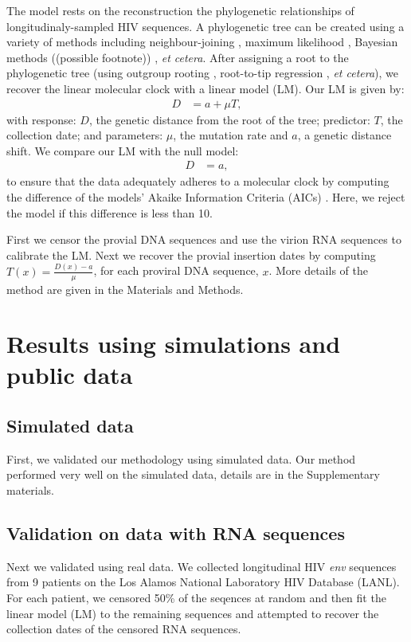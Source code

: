 \documentclass[12pt,onecolumn,twoside]{pnas-new}
\begin{document}
The model rests on the reconstruction the phylogenetic relationships of longitudinaly-sampled HIV sequences.
A phylogenetic tree can be created using a variety of methods including neighbour-joining \cite{Saitou87}, maximum likelihood \cite{fasttree,raxml}, Bayesian methods ((possible footnote)) \cite{beast,MRBAYES}, \emph{et cetera}.
After assigning a root to the phylogenetic tree (using outgroup rooting  \cite{Huelsenbeck02}, root-to-tip regression  \cite{Korber00}, \emph{et cetera}), we recover the linear molecular clock with a linear model (LM).
Our LM is given by:
\begin{align}
	D &= a + \mu T,\label{eq:glm}
\end{align}
with response: $D$, the genetic distance from the root of the tree; predictor: $T$, the collection date; and parameters: $\mu$, the mutation rate and $a$, a genetic distance shift.
We compare our LM with the null model:
\begin{align}
	D &= a,\label{eq:null}
\end{align}
to ensure that the data adequately adheres to a molecular clock by computing the difference of the models' Akaike Information Criteria (AICs) \cite{Akaike74}.
Here, we reject the model if this difference is less than 10.

First we censor the provial DNA sequences and use the virion RNA sequences to calibrate the LM.
Next we recover the provial insertion dates by computing $T(x) = \frac{D(x) - a}{\mu}$, for each proviral DNA sequence, $x$.
More details of the method are given in the Materials and Methods.

\section*{Results using simulations and public data}

\subsection*{Simulated data}

First, we validated our methodology using simulated data.
Our method performed very well on the simulated data, details are in the Supplementary materials.

\subsection*{Validation on data with RNA sequences}

Next we validated using real data.
We collected longitudinal HIV \emph{env} sequences from 9 patients on the Los Alamos National Laboratory HIV Database (LANL).
For each patient, we censored 50\% of the seqences at random and then fit the linear model (LM) to the remaining sequences and attempted to recover the collection dates of the censored RNA sequences.
\end{document}

